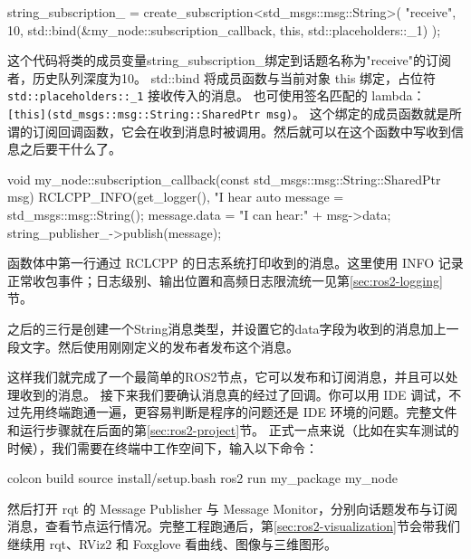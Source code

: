 \par\medskip\noindent\begin{minipage}{\linewidth}
\begin{tcode}
    string_subscription_ = create_subscription<std_msgs::msg::String>(
         "receive",
         10,
         std::bind(&my_node::subscription_callback, this, std::placeholders::_1)
         );
\end{tcode}
\end{minipage}\par\smallskip
这个代码将类的成员变量string\_subscription\_绑定到话题名称为"receive"的订阅者，历史队列深度为10。
std::bind 将成员函数与当前对象 this 绑定，占位符 \texttt{std::placeholders::\_1} 接收传入的消息。
也可使用签名匹配的 lambda：\texttt{[this](std\_msgs::msg::String::SharedPtr msg)}。
这个绑定的成员函数就是所谓的订阅回调函数，它会在收到消息时被调用。然后就可以在这个函数中写收到信息之后要干什么了。
\par\medskip\noindent\begin{minipage}{\linewidth}
\begin{tcode}
void my_node::subscription_callback(const std_msgs::msg::String::SharedPtr msg)
{
 RCLCPP_INFO(get_logger(), "I hear %
 auto message = std_msgs::msg::String();
 message.data = "I can hear:" + msg->data;
 string_publisher_->publish(message);
}
\end{tcode}
\end{minipage}\par\smallskip

函数体中第一行通过 RCLCPP 的日志系统打印收到的消息。这里使用 INFO 记录正常收包事件；日志级别、输出位置和高频日志限流统一见第\ref{sec:ros2-logging}节。

之后的三行是创建一个String消息类型，并设置它的data字段为收到的消息加上一段文字。然后使用刚刚定义的发布者发布这个消息。

这样我们就完成了一个最简单的ROS2节点，它可以发布和订阅消息，并且可以处理收到的消息。
接下来我们要确认消息真的经过了回调。你可以用 IDE 调试，不过先用终端跑通一遍，更容易判断是程序的问题还是 IDE 环境的问题。完整文件和运行步骤就在后面的第\ref{sec:ros2-project}节。
正式一点来说（比如在实车测试的时候），我们需要在终端中工作空间下，输入以下命令：
\par\medskip\noindent\begin{minipage}{\linewidth}
\begin{tbash}
    colcon build
    source install/setup.bash
    ros2 run my_package my_node
\end{tbash}
\end{minipage}\par\smallskip
然后打开 rqt 的 Message Publisher 与 Message Monitor，分别向话题发布与订阅消息，查看节点运行情况。完整工程跑通后，第\ref{sec:ros2-visualization}节会带我们继续用 rqt、RViz2 和 Foxglove 看曲线、图像与三维图形。

